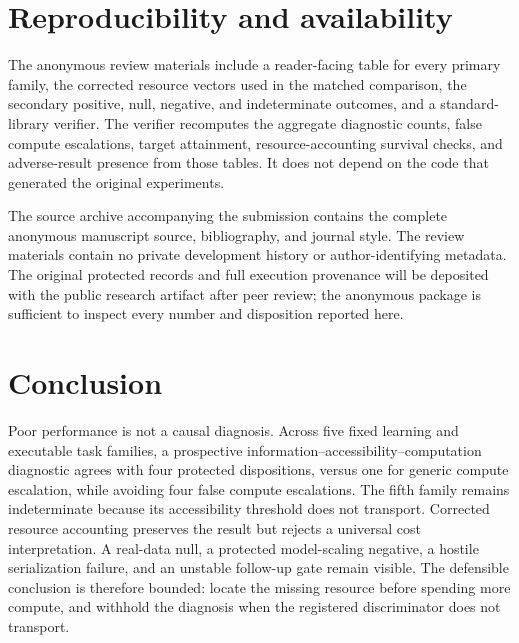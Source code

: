 \documentclass[10pt]{article}
\begin{document}
\section{Reproducibility and availability}

The anonymous review materials include a reader-facing table for every primary family, the corrected resource vectors used in the matched comparison, the secondary positive, null, negative, and indeterminate outcomes, and a standard-library verifier. The verifier recomputes the aggregate diagnostic counts, false compute escalations, target attainment, resource-accounting survival checks, and adverse-result presence from those tables. It does not depend on the code that generated the original experiments.

The source archive accompanying the submission contains the complete anonymous manuscript source, bibliography, and journal style. The review materials contain no private development history or author-identifying metadata. The original protected records and full execution provenance will be deposited with the public research artifact after peer review; the anonymous package is sufficient to inspect every number and disposition reported here.

\section{Conclusion}

Poor performance is not a causal diagnosis. Across five fixed learning and executable task families, a prospective information--accessibility--computation diagnostic agrees with four protected dispositions, versus one for generic compute escalation, while avoiding four false compute escalations. The fifth family remains indeterminate because its accessibility threshold does not transport. Corrected resource accounting preserves the result but rejects a universal cost interpretation. A real-data null, a protected model-scaling negative, a hostile serialization failure, and an unstable follow-up gate remain visible. The defensible conclusion is therefore bounded: locate the missing resource before spending more compute, and withhold the diagnosis when the registered discriminator does not transport.



\end{document}

